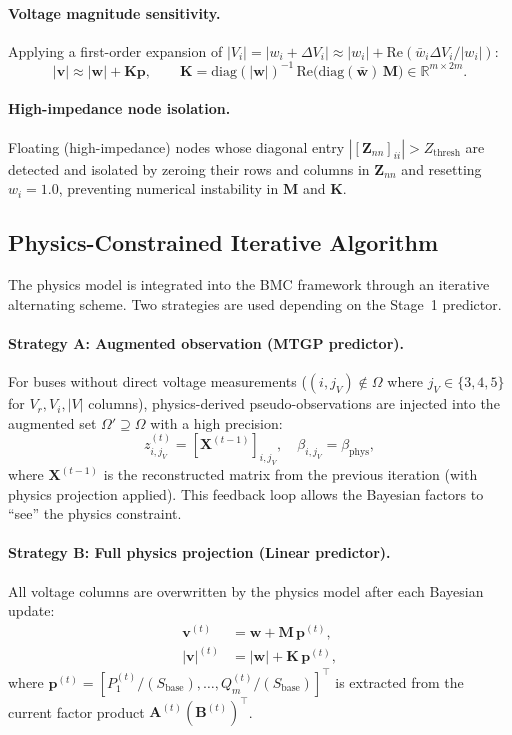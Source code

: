 \documentclass[11pt,a4paper]{article}
\newcommand{\R}{\mathbb{R}}
\newcommand{\diag}{\mathrm{diag}}
\begin{document}
\paragraph{Voltage magnitude sensitivity.} Applying a first-order expansion of $|V_i| = |w_i + \Delta V_i| \approx |w_i| + \mathrm{Re}(\bar{w}_i \Delta V_i / |w_i|)$:
\begin{equation}\label{eq:K}
  |\bm{v}| \approx |\bm{w}| + \bm{K}\bm{p},
  \qquad
  \bm{K} = \diag(|\bm{w}|)^{-1}\,\mathrm{Re}\!\bigl(\diag(\bar{\bm{w}})\,\bm{M}\bigr) \in \R^{m \times 2m}.
\end{equation}

\paragraph{High-impedance node isolation.} Floating (high-impedance) nodes whose diagonal entry $|[\bm{Z}_{nn}]_{ii}| > Z_{\text{thresh}}$ are detected and isolated by zeroing their rows and columns in $\bm{Z}_{nn}$ and resetting $w_i = 1.0$, preventing numerical instability in $\bm{M}$ and $\bm{K}$.

\subsection{Physics-Constrained Iterative Algorithm}
\label{sec:physics_iter}
The physics model is integrated into the BMC framework through an iterative alternating scheme. Two strategies are used depending on the Stage~1 predictor.

\paragraph{Strategy A: Augmented observation (MTGP predictor).}
For buses without direct voltage measurements ($(i, j_V) \notin \Omega$ where $j_V \in \{3,4,5\}$ for $V_r, V_i, |V|$ columns), physics-derived pseudo-observations are injected into the augmented set $\Omega' \supseteq \Omega$ with a high precision:
\begin{equation}\label{eq:augmented}
  z_{i,j_V}^{(t)} = [\bm{X}^{(t-1)}]_{i,j_V}, \quad
  \beta_{i,j_V} = \beta_{\text{phys}},
\end{equation}
where $\bm{X}^{(t-1)}$ is the reconstructed matrix from the previous iteration (with physics projection applied). This feedback loop allows the Bayesian factors to ``see'' the physics constraint.

\paragraph{Strategy B: Full physics projection (Linear predictor).}
All voltage columns are overwritten by the physics model after each Bayesian update:
\begin{align}
  \bm{v}^{(t)} &= \bm{w} + \bm{M}\, \bm{p}^{(t)}, \label{eq:v_complex}\\
  |\bm{v}|^{(t)} &= |\bm{w}| + \bm{K}\, \bm{p}^{(t)}, \label{eq:v_mag}
\end{align}
where $\bm{p}^{(t)} = [P^{(t)}_1/(S_{\text{base}}),\dots, Q^{(t)}_m/(S_{\text{base}})]^\top$ is extracted from the current factor product $\bm{A}^{(t)}(\bm{B}^{(t)})^\top$.
\end{document}
